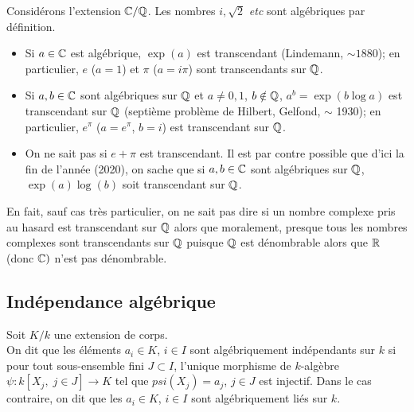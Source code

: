   
\begin{exemple}
  Considérons l'extension $\mathbb{C}/\mathbb{Q}$. Les nombres $i,\sqrt{2}$
  \textit{etc} sont algébriques par définition.
  \begin{itemize}
  \item Si $a\in \mathbb{C}$ est algébrique, $\exp(a)$ est transcendant
    (Lindemann, $\sim 1880$); en particulier, $e$ ($a=1$) et $\pi$
    ($a=i\pi$) sont transcendants sur $\mathbb{Q}$.
  \item Si $a,b\in \mathbb{C}$ sont algébriques sur $\mathbb{Q}$ et $a\not=0,1$,
    $b\notin \mathbb{Q}$, $a^b=\exp(b\log a)$ est transcendant sur $\mathbb{Q}$
    (septième problème de Hilbert, Gelfond, $\sim$ 1930); en
    particulier, $e^\pi$ ($a=e^\pi$, $b=i$) est transcendant sur
    $\mathbb{Q}$.
  \item On ne sait pas si $e+\pi$ est transcendant. Il est par
    contre possible que d'ici la fin de l'année (2020), on sache que
    si $a,b\in \mathbb{C}$ sont algébriques sur $\mathbb{Q}$, $\exp(a)\log(b)$ soit
    transcendant sur $\mathbb{Q}$.
  \end{itemize}
  En fait, sauf cas très particulier, on ne sait pas dire si un
  nombre complexe pris \og au hasard\fg{} est transcendant sur $\mathbb{Q}$ alors
  que moralement, \og presque tous\fg{} les nombres complexes sont
  transcendants sur $\mathbb{Q}$ puisque $\mathbb{Q}$ est dénombrable alors que $\mathbb{R}$
  (donc $\mathbb{C}) $ n'est pas dénombrable.
\end{exemple}

\subsection{Indépendance algébrique}

\begin{definition}
  Soit $K/k$ une extension de corps.\\
  On dit que les éléments $a_i\in K$, $i\in I$ sont algébriquement
  indépendants sur $k$ si pour tout sous-ensemble fini $J\subset I$,
  l'unique morphisme de $k$-algèbre
  $\psi:k[X_j,\; j\in J]\rightarrow K$ tel que $psi(X_j)= a_j$,
  $j\in J$ est injectif.
  Dans le cas contraire, on dit que les $a_i\in K$, $i\in I$ sont
  algébriquement liés sur $k$.
\end{definition}

